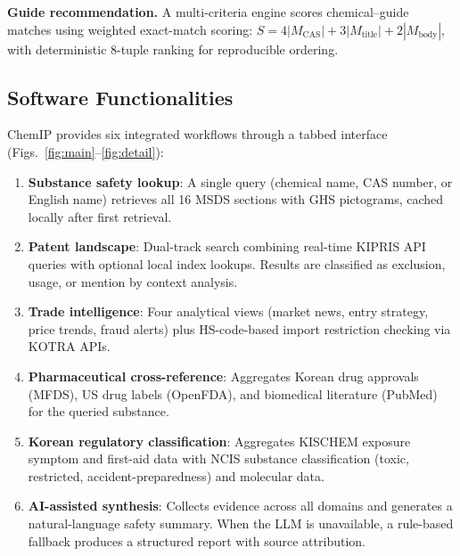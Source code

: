 \documentclass[preprint,12pt]{elsarticle}
\begin{document}
\textbf{Guide recommendation.}
A multi-criteria engine scores chemical--guide matches using weighted exact-match scoring: $S = 4|M_{\text{CAS}}| + 3|M_{\text{title}}| + 2|M_{\text{body}}|$, with deterministic 8-tuple ranking for reproducible ordering.

\subsection{Software Functionalities}
\label{sec:functionalities}

ChemIP provides six integrated workflows through a tabbed interface (Figs.~\ref{fig:main}--\ref{fig:detail}):

\begin{enumerate}
  \item \textbf{Substance safety lookup}: A single query (chemical name, CAS number, or English name) retrieves all 16 MSDS sections with GHS pictograms, cached locally after first retrieval.
  \item \textbf{Patent landscape}: Dual-track search combining real-time KIPRIS API queries with optional local index lookups. Results are classified as exclusion, usage, or mention by context analysis.
  \item \textbf{Trade intelligence}: Four analytical views (market news, entry strategy, price trends, fraud alerts) plus HS-code-based import restriction checking via KOTRA APIs.
  \item \textbf{Pharmaceutical cross-reference}: Aggregates Korean drug approvals (MFDS), US drug labels (OpenFDA), and biomedical literature (PubMed) for the queried substance.
  \item \textbf{Korean regulatory classification}: Aggregates KISCHEM exposure symptom and first-aid data with NCIS substance classification (toxic, restricted, accident-preparedness) and molecular data.
  \item \textbf{AI-assisted synthesis}: Collects evidence across all domains and generates a natural-language safety summary. When the LLM is unavailable, a rule-based fallback produces a structured report with source attribution.
\end{enumerate}
\end{document}
